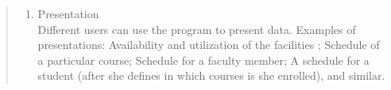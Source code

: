 \documentclass{article}
\begin{document}
\begin{quotation}
\begin{enumerate}
\item Presentation \\
Different users can use the program to present data. Examples of presentations: Availability and utilization of the facilities ; Schedule of a particular course; Schedule for a faculty member; A schedule for a student (after she defines in which courses is she enrolled), and similar.
\end{enumerate}

\end{quotation}










 
\end{document}
